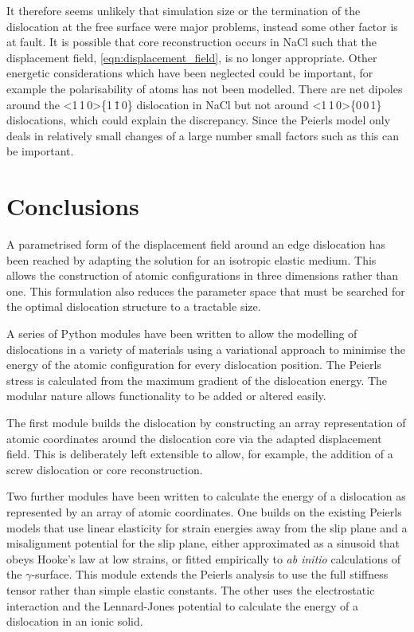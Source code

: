It therefore seems unlikely that simulation size or the termination of the dislocation at the free surface were major problems, instead some other factor is at fault. It is possible that core reconstruction occurs in NaCl such that the displacement field, \autoref{eqn:displacement_field}, is no longer appropriate. Other energetic considerations which have been neglected could be important, for example the polarisability of atoms has not been modelled. There are net dipoles around the <1\,1\,0>\{1\,\={1}\,0\} dislocation in NaCl but not around <1\,1\,0>\{0\,0\,1\} dislocations, which could explain the discrepancy. Since the Peierls model only deals in relatively small changes of a large number small factors such as this can be important.


\section{Conclusions}

A parametrised form of the displacement field around an edge dislocation has been reached by adapting the solution for an isotropic elastic medium. This allows the construction of atomic configurations in three dimensions rather than one. This formulation also reduces the parameter space that must be searched for the optimal dislocation structure to a tractable size.

A series of Python modules have been written to allow the modelling of dislocations in a variety of materials using a variational approach to minimise the energy of the atomic configuration for every dislocation position. The Peierls stress is calculated from the maximum gradient of the dislocation energy. The modular nature allows functionality to be added or altered easily. 

The first module builds the dislocation by constructing an array representation of atomic coordinates around the dislocation core via the adapted displacement field. This is deliberately left extensible to allow, for example, the addition of a screw dislocation or core reconstruction.

Two further modules have been written to calculate the energy of a dislocation as represented by an array of atomic coordinates. One builds on the existing Peierls models that use linear elasticity for strain energies away from the slip plane and a misalignment potential for the slip plane, either approximated as a sinusoid that obeys Hooke's law at low strains, or fitted empirically to \emph{ab initio} calculations of the $\gamma$-surface. This module extends the Peierls analysis to use the full stiffness tensor rather than simple elastic constants. The other uses the electrostatic interaction and the Lennard-Jones potential to calculate the energy of a dislocation in an ionic solid.

